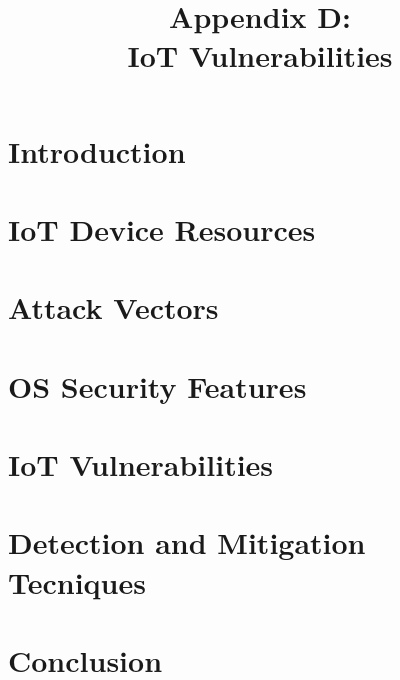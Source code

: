\documentclass[a4paper 12pt]{article}
\title{%
  Appendix D: \\
  \large IoT Vulnerabilities}
\date{}
\begin{document}
\setcounter{page}{1}
\renewcommand{\thepage}{D-\arabic{page}}
\maketitle
\section{Introduction}

\section{IoT Device Resources}

\section{Attack Vectors}

\section{OS Security Features}

\section{IoT Vulnerabilities}

\section{Detection and Mitigation Tecniques}

\section{Conclusion}

\clearpage
\printbibliography
\end{document}

